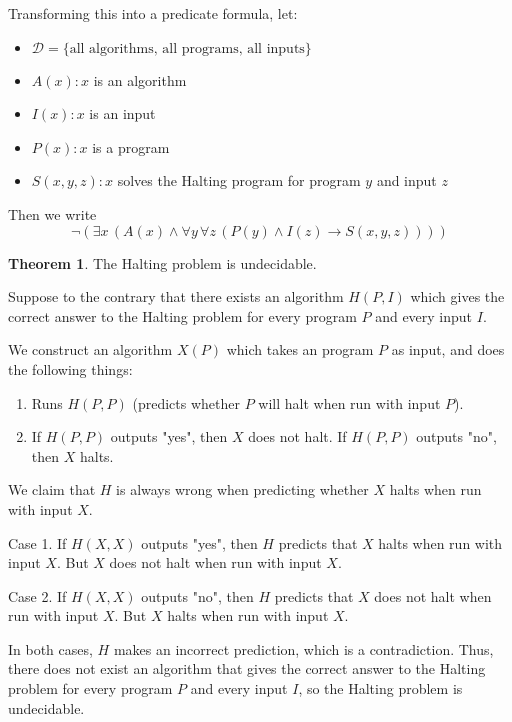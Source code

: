 \documentclass[11pt]{article}
\makeatletter
\theoremstyle{definition}
\newtheorem{thm}{Theorem}[section]
\newenvironment{pf}[1][\proofname]{\par
  \pushQED{\qed}%
  \normalfont \topsep0\p@\relax
  \trivlist
  \item[\hskip\labelsep\itshape
  #1\@addpunct{.}]\ignorespaces
}{%
  \popQED\endtrivlist\@endpefalse
}
\makeatother
\begin{document}
Transforming this into a predicate formula, let:\vspace{-1.5ex}
\begin{itemize}
    \item $\mathcal{D} = \{\text{all algorithms, all programs, all inputs}\}$
    \item $A(x) : x$ is an algorithm
    \item $I(x) : x$ is an input
    \item $P(x) : x$ is a program
    \item $S(x, y, z) : x$ solves the Halting program for program $y$ and input $z$
\end{itemize}\vspace{-1.5ex}
Then we write
$$\neg (\exists x \, (A(x) \wedge \forall y \, \forall z \, (P(y) \wedge I(z) \rightarrow S(x, y, z))))$$
\begin{thm}
The Halting problem is undecidable.
\begin{pf}
Suppose to the contrary that there exists an algorithm $H(P, I)$ which gives the correct answer to the Halting problem for every program $P$ and every input $I$.

We construct an algorithm $X(P)$ which takes an program $P$ as input, and does the following things:\vspace{-1.5ex}
\begin{enumerate}[(1)]
\item Runs $H(P, P)$ (predicts whether $P$ will halt when run with input $P$).
\item If $H(P, P)$ outputs "yes", then $X$ does not halt. If $H(P, P)$ outputs "no", then $X$ halts.
\end{enumerate}\vspace{-1.5ex}
We claim that $H$ is always wrong when predicting whether $X$ halts when run with input $X$.

{\sc Case 1.} If $H(X, X)$ outputs "yes", then $H$ predicts that $X$ halts when run with input $X$. But $X$ does not halt when run with input $X$.

{\sc Case 2.} If $H(X, X)$ outputs "no", then $H$ predicts that $X$ does not halt when run with input $X$. But $X$ halts when run with input $X$.

In both cases, $H$ makes an incorrect prediction, which is a contradiction. Thus, there does not exist an algorithm that gives the correct answer to the Halting problem for every program $P$ and every input $I$, so the Halting problem is undecidable.
\end{pf}
\end{thm}
\end{document}
